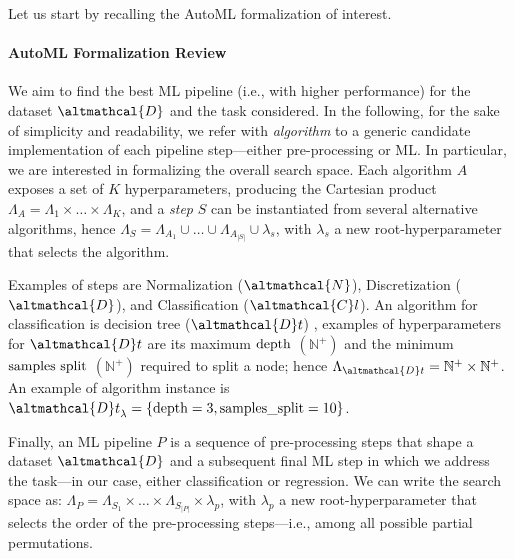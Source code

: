 Let us start by recalling the AutoML formalization of interest.

\paragraph{AutoML Formalization Review}
\label{hamlet-ssec:automl-formalization}
We aim to find the best ML pipeline (i.e., with higher performance) for the dataset $\altmathcal{D}$ and the task considered.
In the following, for the sake of simplicity and readability, we refer with \textit{algorithm} to a generic candidate implementation of each pipeline step---either pre-processing or ML.
In particular, we are interested in formalizing the overall search space.
Each algorithm $A$ exposes a set of $K$ hyperparameters, producing the Cartesian product $\Lambda_A = \Lambda_1 \times \dots \times \Lambda_K$, and a \textit{step} $S$ can be instantiated from several alternative algorithms, hence $\Lambda_S = \Lambda_{A_1} \cup \ldots \cup \Lambda_{A_{|S|}} \cup \lambda_s$, with $\lambda_s$ a new root-hyperparameter that selects the algorithm.

\begin{example}
    Examples of steps are Normalization ($\altmathcal{N}$), Discretization ($\altmathcal{D}$), and Classification ($\altmathcal{C}l$).
    An algorithm for classification is decision tree  ($\altmathcal{D}t$) \cite{DBLP:books/wa/BreimanFOS84},
    examples of hyperparameters for $\altmathcal{D}t$ are its maximum $\textup{depth}$ $(\mathbb{N}^+)$ and the minimum $\textup{samples split}$ $(\mathbb{N}^+)$ required to split a node; hence $\Lambda_{\altmathcal{D}t} = \mathbb{N}^+ \times \mathbb{N}^+$.
    An example of algorithm instance is ${\altmathcal{D}t}_{\lambda}= \{ \textup{depth}=3,\textup{samples\_split}=10 \}$.
\end{example}

Finally, an ML pipeline $P$ is a sequence of pre-processing steps that shape a dataset $\altmathcal{D}$ and a subsequent final ML step in which we address the task---in our case, either classification or regression.
We can write the search space as: $\Lambda_P = \Lambda_{S_1} \times \ldots \times \Lambda_{S_{|P|}} \times \lambda_p$, with $\lambda_p$ a new root-hyperparameter that selects the order of the pre-processing steps---i.e., among all possible partial permutations.

